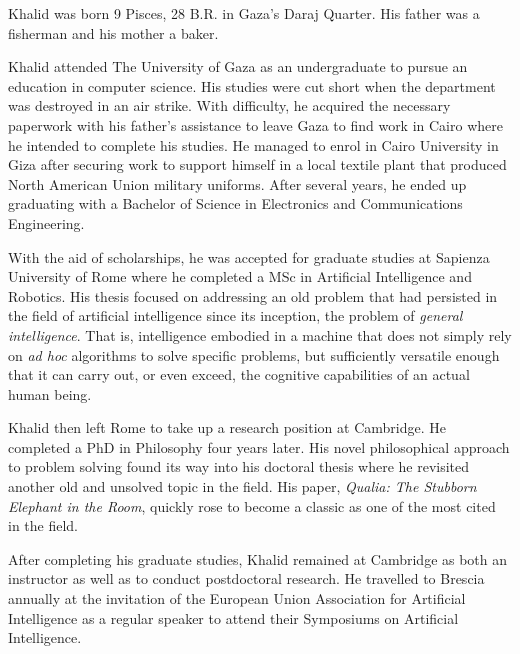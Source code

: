 
Khalid was born 9 Pisces, 28 B.R. in Gaza's Daraj Quarter. His father was a fisherman and his mother a baker.

Khalid attended The University of Gaza as an undergraduate to pursue an education in computer science. His studies were cut short when the department was destroyed in an air strike. With difficulty, he acquired the necessary paperwork with his father's assistance to leave Gaza to find work in Cairo where he intended to complete his studies. He managed to enrol in Cairo University in Giza after securing work to support himself in a local textile plant that produced North American Union military uniforms. After several years, he ended up graduating with a Bachelor of Science in Electronics and Communications Engineering. 

With the aid of scholarships, he was accepted for graduate studies at Sapienza University of Rome where he completed a MSc in Artificial Intelligence and Robotics. His thesis focused on addressing an old problem that had persisted in the field of artificial intelligence since its inception, the problem of {\it general intelligence}. That is, intelligence embodied in a machine that does not simply rely on {\it ad hoc} algorithms to solve specific problems, but sufficiently versatile enough that it can carry out, or even exceed, the cognitive capabilities of an actual human being.

Khalid then left Rome to take up a research position at Cambridge. He completed a PhD in Philosophy four years later. His novel philosophical approach to problem solving found its way into his doctoral thesis where he revisited another old and unsolved topic in the field. His paper, {\it Qualia: The Stubborn Elephant in the Room}, quickly rose to become a classic as one of the most cited in the field.

After completing his graduate studies, Khalid remained at Cambridge as both an instructor as well as to conduct postdoctoral research. He travelled to Brescia annually at the invitation of the European Union Association for Artificial Intelligence as a regular speaker to attend their Symposiums on Artificial Intelligence.

